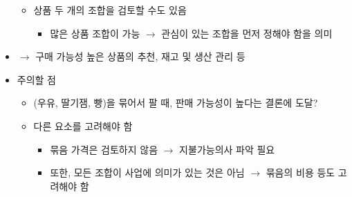 \begin{itemize}
\begin{itemize}
\begin{enumerate}
\begin{enumerate}
\begin{itemize}
				\end{itemize}
			\end{enumerate}				
		\end{enumerate}	
	\item 상품 두 개의 조합을 검토할 수도 있음
		\begin{itemize}
		\item 많은 상품 조합이 가능 $\rightarrow$ 관심이 있는 조합을 먼저 정해야 함을 의미
		\end{itemize}
	\end{itemize}
\item $\rightarrow$ 구매 가능성 높은 상품의 추천, 재고 및 생산 관리 등
\item 주의할 점
	\begin{itemize}
	\item (우유, 딸기잼, 빵)을 묶어서 팔 때, 판매 가능성이 높다는 결론에 도달?
	\item 다른 요소를 고려해야 함
		\begin{itemize}
		\item 묶음 가격은 검토하지 않음 $\rightarrow$ 지불가능의사 파악 필요 
		\item 또한, 모든 조합이 사업에 의미가 있는 것은 아님 $\rightarrow$ 묶음의 비용 등도 고려해야 함
		\end{itemize}
	\end{itemize}
\end{itemize}

